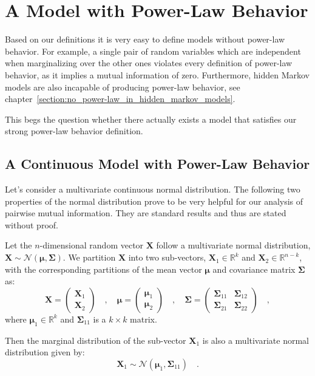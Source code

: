 \documentclass[../../main.tex]{subfiles}
\begin{document}
\chapter{A Model with Power-Law Behavior}
Based on our definitions it is very easy to define models without power-law behavior. For example, a single pair of random variables which are independent when marginalizing over the other ones violates every definition of power-law behavior, as it implies a mutual information of zero. Furthermore, hidden Markov models are also incapable of producing power-law behavior, see chapter~\ref{section:no_power-law_in_hidden_markov_models}.

This begs the question whether there actually exists a model that satisfies our strong power-law behavior definition.

\section{A Continuous Model with Power-Law Behavior}
Let's consider a multivariate continuous normal distribution. The following two properties of the normal distribution prove to be very helpful for our analysis of pairwise mutual information. They are standard results and thus are stated without proof.

\begin{proposition}
    \label{proposition:marginal_distributions_of_a_normal_distribution}
    Let the $n$-dimensional random vector $\bm{X}$ follow a multivariate normal distribution, $\bm{X} \sim \mathcal{N}(\bm{\mu}, \bm{\Sigma})$. We partition $\bm{X}$ into two sub-vectors, $\bm{X}_1 \in \mathbb{R}^k$ and $\bm{X}_2 \in \mathbb{R}^{n-k}$, with the corresponding partitions of the mean vector $\bm{\mu}$ and covariance matrix $\bm{\Sigma}$ as:
    \[
        \bm{X} = \begin{pmatrix} \bm{X}_1 \\ \bm{X}_2 \end{pmatrix} \quad , \quad 
        \bm{\mu} = \begin{pmatrix} \bm{\mu}_1 \\ \bm{\mu}_2 \end{pmatrix} \quad , \quad 
        \bm{\Sigma} = \begin{pmatrix} \bm{\Sigma}_{11} & \bm{\Sigma}_{12} \\ \bm{\Sigma}_{21} & \bm{\Sigma}_{22} \end{pmatrix} \quad ,
    \]
    where $\bm{\mu}_1 \in \mathbb{R}^k$ and $\bm{\Sigma}_{11}$ is a $k \times k$ matrix.
    
    Then the marginal distribution of the sub-vector $\bm{X}_1$ is also a multivariate normal distribution given by:
    \[
        \bm{X}_1 \sim \mathcal{N}(\bm{\mu}_1, \bm{\Sigma}_{11}) \quad .
    \]
\end{proposition}
\end{document}
